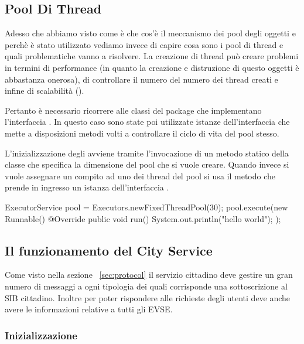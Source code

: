 \subsection{Pool Di Thread}

Adesso che abbiamo visto come è che cos'è il meccanismo dei pool degli oggetti e perchè è stato utilizzato vediamo invece di capire cosa sono i pool di thread e quali problematiche vanno a risolvere.
La creazione di thread può creare problemi in termini di performance (in quanto la creazione e distruzione di questo oggetti è abbastanza onerosa), di controllare il numero del numero dei thread creati e infine di scalabilità (\cite{vetti2008}).

Pertanto è necessario ricorrere alle classi del package  che implementano l'interfaccia . In questo caso sono state poi utilizzate istanze dell'interfaccia  che mette a disposizioni metodi volti a controllare il ciclo di vita del pool stesso.

L'inizializzazione degli  avviene tramite l'invocazione di un metodo statico della classe  che specifica la dimensione del pool che si vuole creare. Quando invece si vuole assegnare un compito ad uno dei thread del pool si usa il metodo  che prende in ingresso un istanza dell'interfaccia .

\begin{java}[caption={Creazione Pool di Thread},label={lst:threadPool}]
ExecutorService pool = Executors.newFixedThreadPool(30);
pool.execute(new Runnable() {
	@Override
	public void run() {
		System.out.println("hello world");
	}
});
\end{java}

\subsection{Il funzionamento del City Service}
 
Come visto nella sezione ~\ref{sec:protocol} il servizio cittadino deve gestire un gran numero di messaggi a ogni tipologia dei quali corrisponde una sottoscrizione al SIB cittadino. Inoltre per poter rispondere alle richieste degli utenti deve anche avere le informazioni relative a tutti gli EVSE.

\subsubsection{Inizializzazione}

